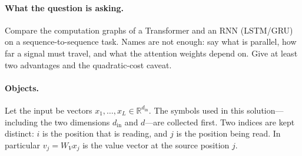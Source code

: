 \documentclass[11pt,a4paper]{article}
\theoremstyle{definition}
\begin{document}
\paragraph{What the question is asking.}
Compare the computation graphs of a Transformer and an RNN (LSTM/GRU) on a sequence-to-sequence task. Names are not enough: say what is parallel, how far a signal must travel, and what the attention weights depend on. Give at least two advantages and the quadratic-cost caveat.

\paragraph{Objects.}
Let the input be vectors \(x_1,\ldots,x_L\in\mathbb{R}^{d_{\mathrm{in}}}\). The symbols used in this solution---including the two dimensions \(d_{\mathrm{in}}\) and \(d\)---are collected first. Two indices are kept distinct: \(i\) is the position that is reading, and \(j\) is the position being read. In particular \(v_j=W_V x_j\) is the value vector at the source position \(j\).
\end{document}
